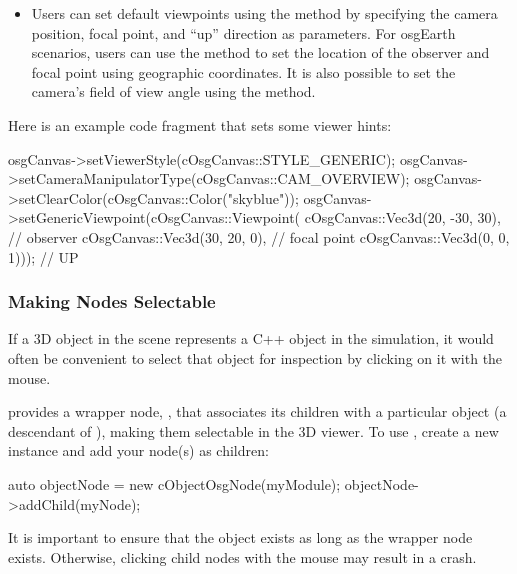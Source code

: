 \begin{itemize}
  \item {} Users can set default viewpoints
    using the  method by specifying the camera
    position, focal point, and ``up'' direction as parameters. For osgEarth
    scenarios, users can use the  method to set the
    location of the observer and focal point using geographic coordinates. It is
    also possible to set the camera's field of view angle using the
     method.
\end{itemize}

Here is an example code fragment that sets some viewer hints:

\begin{cpp}
osgCanvas->setViewerStyle(cOsgCanvas::STYLE_GENERIC);
osgCanvas->setCameraManipulatorType(cOsgCanvas::CAM_OVERVIEW);
osgCanvas->setClearColor(cOsgCanvas::Color("skyblue"));
osgCanvas->setGenericViewpoint(cOsgCanvas::Viewpoint(
        cOsgCanvas::Vec3d(20, -30, 30), // observer
        cOsgCanvas::Vec3d(30, 20, 0),   // focal point
        cOsgCanvas::Vec3d(0, 0, 1)));   // UP
\end{cpp}


\subsubsection{Making Nodes Selectable}
\label{sec:graphics:making-osg-nodes-selectable}

If a 3D object in the scene represents a C++ object in the simulation, it would
often be convenient to select that object for inspection by clicking on it with
the mouse.

{\opp} provides a wrapper node, , that associates its
children with a particular {\opp} object (a descendant of ),
making them selectable in the 3D viewer. To use , create
a new instance and add your node(s) as children:

\begin{cpp}
auto objectNode = new cObjectOsgNode(myModule);
objectNode->addChild(myNode);
\end{cpp}

\begin{note}
It is important to ensure that the {\opp} object exists as long as the wrapper
node exists. Otherwise, clicking child nodes with the mouse may result in a
crash.
\end{note}

